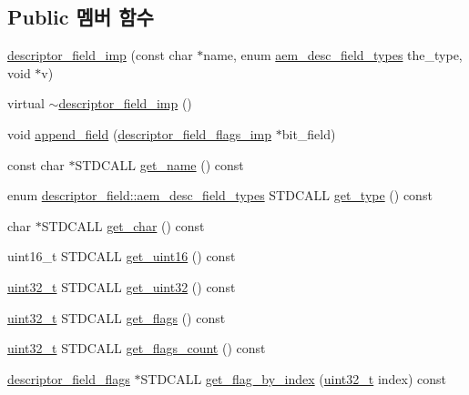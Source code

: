 \subsection*{Public 멤버 함수}
\begin{DoxyCompactItemize}
\item 
\hyperlink{classavdecc__lib_1_1descriptor__field__imp_a69264be3e599a97f9f3c22c754edda88}{descriptor\+\_\+field\+\_\+imp} (const char $\ast$name, enum \hyperlink{classavdecc__lib_1_1descriptor__field_afcc9e2e668064d50ec69a4f95b154396}{aem\+\_\+desc\+\_\+field\+\_\+types} the\+\_\+type, void $\ast$v)
\item 
virtual \hyperlink{classavdecc__lib_1_1descriptor__field__imp_ae53fbaa28e3ab9db6a17fbc426d48df8}{$\sim$descriptor\+\_\+field\+\_\+imp} ()
\item 
void \hyperlink{classavdecc__lib_1_1descriptor__field__imp_a71f6bbed9c3dbef1c43b54cef3b413a8}{append\+\_\+field} (\hyperlink{classavdecc__lib_1_1descriptor__field__flags__imp}{descriptor\+\_\+field\+\_\+flags\+\_\+imp} $\ast$bit\+\_\+field)
\item 
const char $\ast$S\+T\+D\+C\+A\+LL \hyperlink{classavdecc__lib_1_1descriptor__field__imp_af5592779065551a8557d5b1a2717e88d}{get\+\_\+name} () const 
\item 
enum \hyperlink{classavdecc__lib_1_1descriptor__field_afcc9e2e668064d50ec69a4f95b154396}{descriptor\+\_\+field\+::aem\+\_\+desc\+\_\+field\+\_\+types} S\+T\+D\+C\+A\+LL \hyperlink{classavdecc__lib_1_1descriptor__field__imp_ada75d6937c867eb966e41823aa23cda0}{get\+\_\+type} () const 
\item 
char $\ast$S\+T\+D\+C\+A\+LL \hyperlink{classavdecc__lib_1_1descriptor__field__imp_a3564af1c23eb53194da03d9f0e7e3ddb}{get\+\_\+char} () const 
\item 
uint16\+\_\+t S\+T\+D\+C\+A\+LL \hyperlink{classavdecc__lib_1_1descriptor__field__imp_a5c589216a15224698015b46508272429}{get\+\_\+uint16} () const 
\item 
\hyperlink{parse_8c_a6eb1e68cc391dd753bc8ce896dbb8315}{uint32\+\_\+t} S\+T\+D\+C\+A\+LL \hyperlink{classavdecc__lib_1_1descriptor__field__imp_a81eef286a0ee26427be7d293279737e9}{get\+\_\+uint32} () const 
\item 
\hyperlink{parse_8c_a6eb1e68cc391dd753bc8ce896dbb8315}{uint32\+\_\+t} S\+T\+D\+C\+A\+LL \hyperlink{classavdecc__lib_1_1descriptor__field__imp_acf1cbd51479ef5b02d4b7274242e5a13}{get\+\_\+flags} () const 
\item 
\hyperlink{parse_8c_a6eb1e68cc391dd753bc8ce896dbb8315}{uint32\+\_\+t} S\+T\+D\+C\+A\+LL \hyperlink{classavdecc__lib_1_1descriptor__field__imp_ad26d3ba22faa3ff8a7fd61176dcc59b3}{get\+\_\+flags\+\_\+count} () const 
\item 
\hyperlink{classavdecc__lib_1_1descriptor__field__flags}{descriptor\+\_\+field\+\_\+flags} $\ast$S\+T\+D\+C\+A\+LL \hyperlink{classavdecc__lib_1_1descriptor__field__imp_a69b5c8b51e2e3a7745d7a8528490f39d}{get\+\_\+flag\+\_\+by\+\_\+index} (\hyperlink{parse_8c_a6eb1e68cc391dd753bc8ce896dbb8315}{uint32\+\_\+t} index) const 
\end{DoxyCompactItemize}
